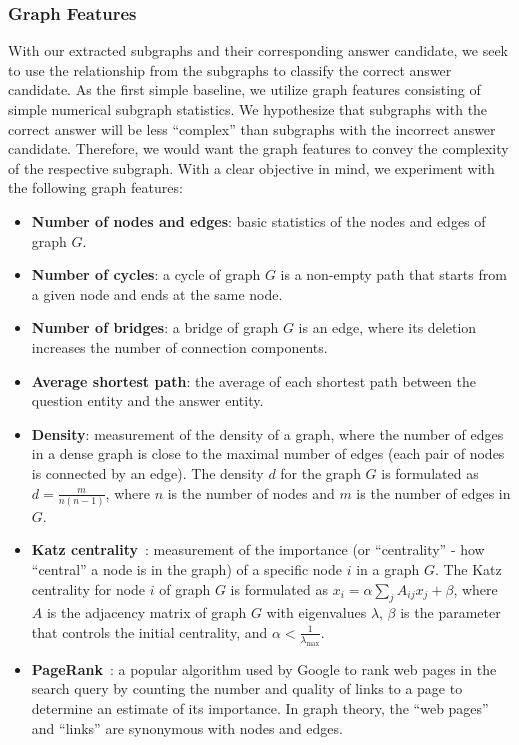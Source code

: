 \subsubsection{Graph Features} \label{sec:methods_kg_path_fusion:graph_features}
With our extracted subgraphs and their corresponding answer candidate, we seek to use the relationship from the subgraphs to classify the correct answer candidate. As the first simple baseline, we utilize graph features consisting of simple numerical subgraph statistics. We hypothesize that subgraphs with the correct answer will be less ``complex'' than subgraphs with the incorrect answer candidate. Therefore, we would want the graph features to convey the complexity of the respective subgraph. With a clear objective in mind, we experiment with the following graph features:  

\begin{itemize}
    \item \textbf{Number of nodes and edges}: basic statistics of the nodes and edges of graph $G$.
    \item \textbf{Number of cycles}: a cycle of graph $G$ is a non-empty path that starts from a given node and ends at the same node. 
    \item \textbf{Number of bridges}: a bridge of graph $G$ is an edge, where its deletion increases the number of connection components. 
    \item \textbf{Average shortest path}: the average of each shortest path between the question entity and the answer entity. 
    \item \textbf{Density}: measurement of the density of a graph, where the number of edges in a dense graph is close to the maximal number of edges (each pair of nodes is connected by an edge). The density $d$ for the graph $G$ is formulated as $d = \frac{m}{n(n-1)}$, where $n$ is the number of nodes and $m$ is the number of edges in $G$.
   \item \textbf{Katz centrality}~\cite{katz1953new}: measurement of the importance (or ``centrality'' - how ``central'' a node is in the graph) of a specific node $i$ in a graph $G$. The Katz centrality for node $i$ of graph $G$ is formulated as $x_i = \alpha \sum_{j} A_{ij} x_j + \beta$, where $A$ is the adjacency matrix of graph $G$ with eigenvalues $\lambda$, $\beta$ is the parameter that controls the initial centrality, and $\alpha < \frac{1}{\lambda_{\max}}$. 
    \item \textbf{PageRank}~\cite{page1999pagerank}: a popular algorithm used by Google to rank web pages in the search query by counting the number and quality of links to a page to determine an estimate of its importance. In graph theory, the ``web pages'' and ``links'' are synonymous with nodes and edges. 
\end{itemize}


